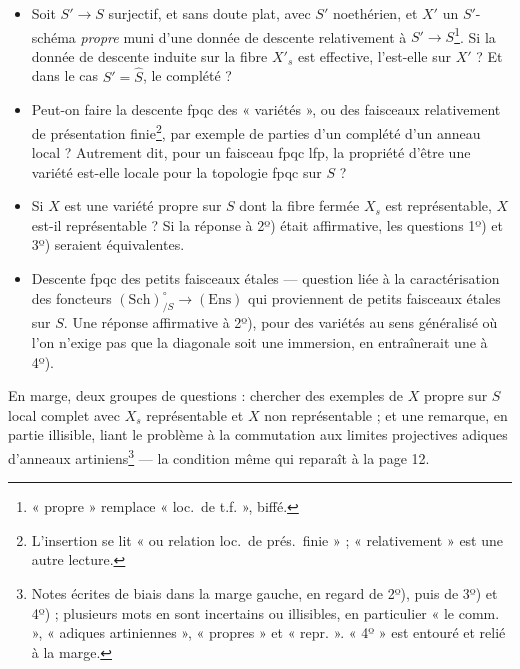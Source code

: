 \documentclass[11pt,a4paper]{article}
\begin{document}
\begin{itemize}
  \item[1º)] Soit $S' \to S$ surjectif, et sans doute plat, avec $S'$
    noethérien, et $X'$ un $S'$-schéma \emph{propre} muni d'une donnée de
    descente relativement à $S' \to S$\footnote{« propre » remplace « loc.\ de
    t.f. », biffé.}. Si la donnée de descente induite sur la fibre $X'_s$ est
    effective, l'est-elle sur $X'$ ? Et dans le cas $S' = \widehat{S}$, le
    complété ?
  \item[2º)] Peut-on faire la descente fpqc des « variétés », ou des faisceaux
    relativement de présentation finie\footnote{L'insertion se lit « ou
    relation loc.\ de prés.\ finie » ; « relativement » est une autre lecture.},
    par exemple de parties d'un complété d'un anneau local ? Autrement dit, pour
    un faisceau fpqc lfp, la propriété d'être une variété est-elle locale pour
    la topologie fpqc sur $S$ ?
  \item[3º)] Si $X$ est une variété propre sur $S$ dont la fibre fermée $X_s$
    est représentable, $X$ est-il représentable ? Si la réponse à 2º) était
    affirmative, les questions 1º) et 3º) seraient équivalentes.
  \item[4º)] Descente fpqc des petits faisceaux étales — question liée à la
    caractérisation des foncteurs $(\mathrm{Sch})^{\circ}_{/S} \to (\mathrm{Ens})$
    qui proviennent de petits faisceaux étales sur $S$. Une réponse affirmative
    à 2º), pour des variétés au sens généralisé où l'on n'exige pas que la
    diagonale soit une immersion, en entraînerait une à 4º).
\end{itemize}

En marge, deux groupes de questions : chercher des exemples de $X$ propre sur
$S$ local complet avec $X_s$ représentable et $X$ non représentable ; et une
remarque, en partie illisible, liant le problème à la commutation aux limites
projectives adiques d'anneaux artiniens\footnote{Notes écrites de biais dans la
marge gauche, en regard de 2º), puis de 3º) et 4º) ; plusieurs mots en sont
incertains ou illisibles, en particulier « le comm. », « adiques artiniennes »,
« propres » et « repr. ». « 4º » est entouré et relié à la marge.} — la
condition même qui reparaît à la page 12.
\end{document}
